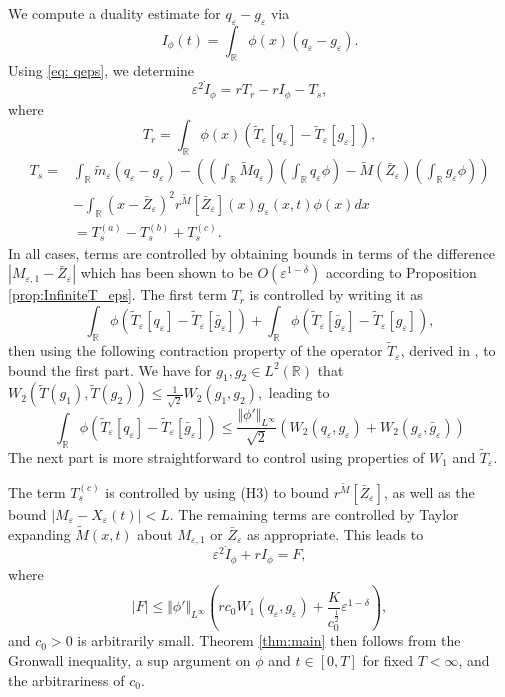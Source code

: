 \documentclass[]{article}
\theoremstyle{remark}
\begin{document}
We compute a duality estimate for $q_\varepsilon-g_\varepsilon$ via 
\[I_\phi(t)=\int_{\mathbb{R}}\phi(x)(q_\varepsilon-g_\varepsilon).\]
Using \eqref{eq: qeps}, we determine
\[\varepsilon^2{}\dot{I}_\phi=rT_{r}-rI_\phi-T_s,\]
where 
\[T_r=\int_{\mathbb{R}}\phi(x)(\tilde{T}_\varepsilon[q_\varepsilon]-\tilde{T}_\varepsilon[g_\varepsilon]),\]
\begin{align*}
    T_s=&\int_{\mathbb{R}}\tilde{m}_\varepsilon(q_\varepsilon-g_\varepsilon)-\left(\left(\int_{\mathbb{R}}\widetilde{M}q_\varepsilon\right)\left(\int_{\mathbb{R}}q_\varepsilon\phi\right)-\widetilde{M}(\bar{Z}_\varepsilon)\left(\int_{\mathbb{R}}g_\varepsilon\phi\right)\right)\\
    &-\int_{\mathbb{R}}(x-\bar{Z}_\varepsilon)^2r^{\widetilde{M}}[\bar{Z}_\varepsilon](x)g_\varepsilon(x,t)\phi(x)dx\\
    &=T_s^{(a)}-T_s^{(b)}+T_s^{(c)}.
\end{align*}
In all cases, terms are controlled by obtaining bounds in terms of the difference $|M_{\varepsilon,1}-\bar{Z}_\varepsilon|$ which has been shown to be $O(\varepsilon^{1-\delta})$ according to Proposition \ref{prop:InfiniteT_eps}. The first term $T_r$ is controlled by writing it as 
\[\int_{\mathbb{R}}\phi(\tilde{T}_\varepsilon[q_\varepsilon]-\tilde{T}_\varepsilon[\bar{g}_\varepsilon])+\int_{\mathbb{R}}\phi(\tilde{T}_\varepsilon[\bar{g}_\varepsilon]-\tilde{T}_\varepsilon[g_\varepsilon]),\]
then using the following contraction property of the operator $\tilde{T}_\varepsilon$, derived in \cite[Appendix 4.2]{raoul2017macroscopic}, to bound the first part. We have for $g_1,g_2\in{}L^2(\mathbb{R})$ that $W_2(\tilde{T}(g_1),\tilde{T}(g_2))\leq{}\frac{1}{\sqrt{2}}W_2(g_1,g_2),$
leading to \[\int_{\mathbb{R}}\phi(\tilde{T}_\varepsilon[q_\varepsilon]-\tilde{T}_\varepsilon[\bar{g}_\varepsilon])\leq{}\frac{\Vert{\phi'}\Vert_{L^\infty}}{\sqrt{2}}\left(W_2(q_\varepsilon,g_\varepsilon)+W_2(g_\varepsilon,\bar{g}_\varepsilon)\right)\]
The next part is more straightforward to control using properties of $W_1$ and $\tilde{T}_\varepsilon$.

The term $T_s^{(c)}$ is controlled by using (H3) to bound $r^{\widetilde{M}}[\bar{Z}_\varepsilon]$, as well as the bound $|{M}_\varepsilon-X_\varepsilon(t)|<L$. The remaining terms are controlled by Taylor expanding $\widetilde{M}(x,t)$ about $M_{\varepsilon,1}$ or $\bar{Z}_\varepsilon$ as appropriate. This leads to 
\[\varepsilon^{2}\dot{I}_\phi+rI_\phi=F,\]
where \[|F|\leq{}\Vert\phi'\Vert_{L^\infty}\left(rc_0W_1(q_\varepsilon,g_\varepsilon)+\frac{K}{c_0^{\frac{1}{2}}}\varepsilon^{1-\delta}\right),\]
and $c_0>0$ is arbitrarily small.
Theorem \ref{thm:main} then follows from the Gronwall inequality, a sup argument on $\phi$ and $t\in[0,T]$ for fixed $T<\infty$, and the arbitrariness of $c_0$.
\end{document}
